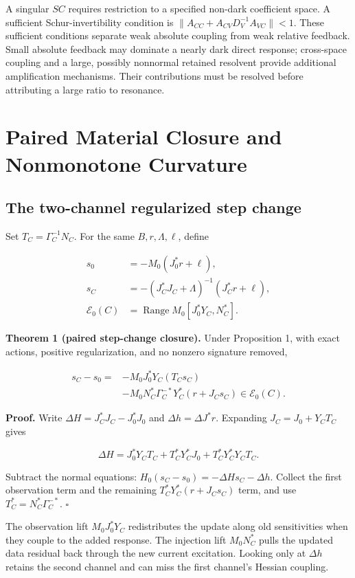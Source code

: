 A singular \(SC\) requires restriction to a specified non-dark coefficient space. A sufficient Schur-invertibility condition is \(\|A_{CC}+A_{CV}D_V^{-1}A_{VC}\|<1\). These sufficient conditions separate weak absolute coupling from weak relative feedback. Small absolute feedback may dominate a nearly dark direct response; cross-space coupling and a large, possibly nonnormal retained resolvent provide additional amplification mechanisms. Their contributions must be resolved before attributing a large ratio to resonance.

\section{Paired Material Closure and Nonmonotone Curvature}

\subsection{The two-channel regularized step change}

Set \(T_C=\Gamma_C^{-1}N_C\). For the same \(B,r,\Lambda,\ell\), define

\[
\begin{aligned}
s_0&=-M_0(J_0^*r+\ell),\\
s_C&=-(J_C^*J_C+\Lambda)^{-1}(J_C^*r+\ell),\\
\mathcal E_0(C)&=\operatorname{Range}M_0[J_0^*Y_C,N_C^*].
\end{aligned}\tag{10}
\]

\textbf{Theorem 1 (paired step-change closure).} Under Proposition 1, with exact actions, positive regularization, and no nonzero signature removed,

\[
\begin{aligned}
s_C-s_0={}&-M_0J_0^*Y_C(T_Cs_C)\\
&-M_0N_C^*\Gamma_C^{-*}Y_C^*(r+J_Cs_C)
\in\mathcal E_0(C).
\end{aligned} \tag{11}
\]

\textbf{Proof.} Write \(\Delta H=J_C^*J_C-J_0^*J_0\) and \(\Delta h=\Delta J^*r\). Expanding \(J_C=J_0+Y_CT_C\) gives

\[
\Delta H=J_0^*Y_CT_C+T_C^*Y_C^*J_0+T_C^*Y_C^*Y_CT_C.
\]

Subtract the normal equations: \(H_0(s_C-s_0)=-\Delta Hs_C-\Delta h\). Collect the first observation term and the remaining \(T_C^*Y_C^*(r+J_Cs_C)\) term, and use \(T_C^*=N_C^*\Gamma_C^{-*}\). \hfill\(\square\)

The observation lift \(M_0J_0^*Y_C\) redistributes the update along old sensitivities when they couple to the added response. The injection lift \(M_0N_C^*\) pulls the updated data residual back through the new current excitation. Looking only at \(\Delta h\) retains the second channel and can miss the first channel's Hessian coupling.

